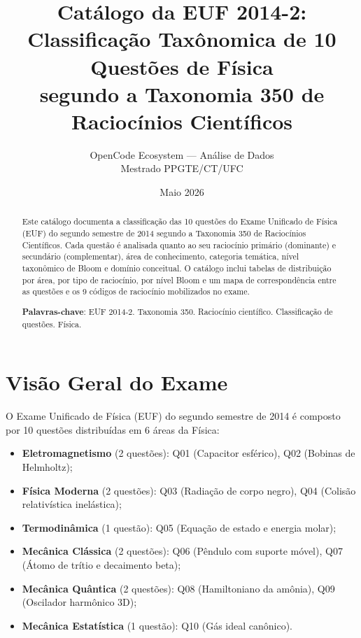 \documentclass[12pt,a4paper]{article}
\title{\textbf{Catálogo da EUF 2014-2:}\\
\large Classificação Taxônomica de 10 Questões de Física\\
segundo a Taxonomia 350 de Raciocínios Científicos}
\author{OpenCode Ecosystem --- Análise de Dados\\
Mestrado PPGTE/CT/UFC}
\date{Maio 2026}
\begin{document}
\maketitle

\begin{abstract}
Este catálogo documenta a classificação das 10 questões do Exame Unificado
de Física (EUF) do segundo semestre de 2014 segundo a Taxonomia 350 de
Raciocínios Científicos. Cada questão é analisada quanto ao seu raciocínio
primário (dominante) e secundário (complementar), área de conhecimento,
categoria temática, nível taxonômico de Bloom e domínio conceitual.
O catálogo inclui tabelas de distribuição por área, por tipo de raciocínio,
por nível Bloom e um mapa de correspondência entre as questões e os 9
códigos de raciocínio mobilizados no exame.
\vspace{0.3cm}

\noindent\textbf{Palavras-chave}: EUF 2014-2. Taxonomia 350. Raciocínio
científico. Classificação de questões. Física.
\end{abstract}

\tableofcontents
\newpage

\section{Visão Geral do Exame}

O Exame Unificado de Física (EUF) do segundo semestre de 2014 é composto
por 10 questões distribuídas em 6 áreas da Física:

\begin{itemize}
  \item \textbf{Eletromagnetismo} (2 questões): Q01 (Capacitor esférico),
    Q02 (Bobinas de Helmholtz);
  \item \textbf{Física Moderna} (2 questões): Q03 (Radiação de corpo negro),
    Q04 (Colisão relativística inelástica);
  \item \textbf{Termodinâmica} (1 questão): Q05 (Equação de estado e energia molar);
  \item \textbf{Mecânica Clássica} (2 questões): Q06 (Pêndulo com suporte móvel),
    Q07 (Átomo de trítio e decaimento beta);
  \item \textbf{Mecânica Quântica} (2 questões): Q08 (Hamiltoniano da amônia),
    Q09 (Oscilador harmônico 3D);
  \item \textbf{Mecânica Estatística} (1 questão): Q10 (Gás ideal canônico).
\end{itemize}
\end{document}
